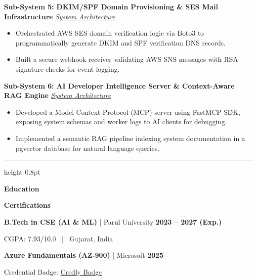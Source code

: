 \documentclass[10pt,a4paper]{article}
\newcommand{\resumesection}[1]{%
  \vspace{5pt}%
  \noindent{\large\textbf{#1}}\par
  \vspace{1pt}%
  \hrule height 0.8pt
  \vspace{3pt}%
}
\begin{document}
\vspace{3pt}

\noindent\textbf{Sub-System 5: DKIM/SPF Domain Provisioning \& SES Mail Infrastructure} \hfill \href{https://github.com/Rahul-pamula/ShrFlow-V1/blob/main/docs/projects/5_domain_provisioning.md}{\small\textit{System Architecture}}
\begin{itemize}[leftmargin=1.2em, topsep=1pt, itemsep=1pt, parsep=0pt, partopsep=0pt]
    \item Orchestrated AWS SES domain verification logic via Boto3 to programmatically generate DKIM and SPF verification DNS records.
    \item Built a secure webhook receiver validating AWS SNS messages with RSA signature checks for event logging.
\end{itemize}

\vspace{3pt}

\noindent\textbf{Sub-System 6: AI Developer Intelligence Server \& Context-Aware RAG Engine} \hfill \href{https://github.com/Rahul-pamula/ShrFlow-V1/blob/main/docs/projects/6_mcp_developer_intelligence.md}{\small\textit{System Architecture}}
\begin{itemize}[leftmargin=1.2em, topsep=1pt, itemsep=1pt, parsep=0pt, partopsep=0pt]
    \item Developed a Model Context Protocol (MCP) server using FastMCP SDK, exposing system schemas and worker logs to AI clients for debugging.
    \item Implemented a semantic RAG pipeline indexing system documentation in a pgvector database for natural language queries.
\end{itemize}

\vspace{4pt}

\resumesection{EDUCATION \& CERTIFICATIONS}
\noindent
\begin{minipage}[t]{0.50\textwidth}
\textbf{Education}
\end{minipage}
\hfill
\begin{minipage}[t]{0.46\textwidth}
\textbf{Certifications}
\end{minipage}

\vspace{3pt}

\noindent
\begin{minipage}[t]{0.50\textwidth}
\textbf{B.Tech in CSE (AI \& ML)} | Parul University \hfill \textbf{2023 -- 2027 (Exp.)} \par
\vspace{1pt}
{\small CGPA: 7.93/10.0 \ | \ Gujarat, India}
\end{minipage}
\hfill
\begin{minipage}[t]{0.46\textwidth}
\textbf{Azure Fundamentals (AZ-900)} | Microsoft \hfill \textbf{2025} \par
\vspace{1pt}
{\small Credential Badge: \href{https://www.credly.com/badges/cb01588f-556d-448d-84f3-aebeef100485/public_url}{Credly Badge}}
\end{minipage}
\end{document}
